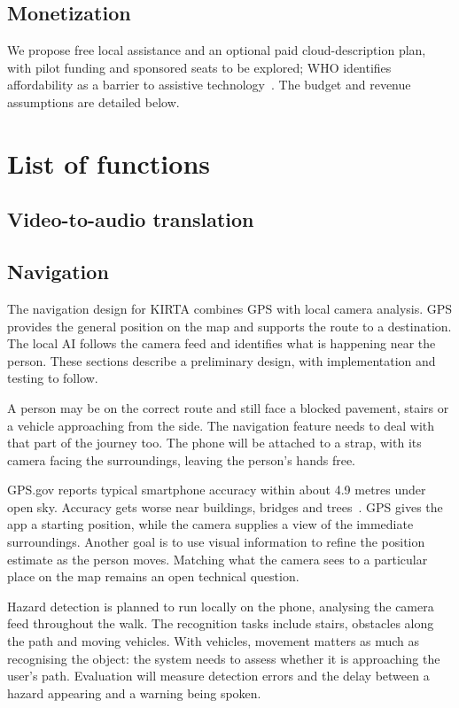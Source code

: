 \documentclass[10pt,twoside,english,a4paper]{article}
\begin{document}
\subsection*{Monetization}


We propose free local assistance and an optional paid cloud-description plan, with pilot funding and sponsored seats to be explored; WHO identifies affordability as a barrier to assistive technology~\cite{whotechnology2024}. The budget and revenue assumptions are detailed below.

\section*{List of functions}
\subsection*{Video-to-audio translation}
\subsection*{Navigation}

The navigation design for KIRTA combines GPS with local camera analysis. GPS provides the general position on the map and supports the route to a destination. The local AI follows the camera feed and identifies what is happening near the person. These sections describe a preliminary design, with implementation and testing to follow.

A person may be on the correct route and still face a blocked pavement, stairs or a vehicle approaching from the side. The navigation feature needs to deal with that part of the journey too. The phone will be attached to a strap, with its camera facing the surroundings, leaving the person's hands free.

GPS.gov reports typical smartphone accuracy within about 4.9 metres under open sky. Accuracy gets worse near buildings, bridges and trees~\cite{gpsaccuracy}. GPS gives the app a starting position, while the camera supplies a view of the immediate surroundings. Another goal is to use visual information to refine the position estimate as the person moves. Matching what the camera sees to a particular place on the map remains an open technical question.

Hazard detection is planned to run locally on the phone, analysing the camera feed throughout the walk. The recognition tasks include stairs, obstacles along the path and moving vehicles. With vehicles, movement matters as much as recognising the object: the system needs to assess whether it is approaching the user's path. Evaluation will measure detection errors and the delay between a hazard appearing and a warning being spoken.
\end{document}

